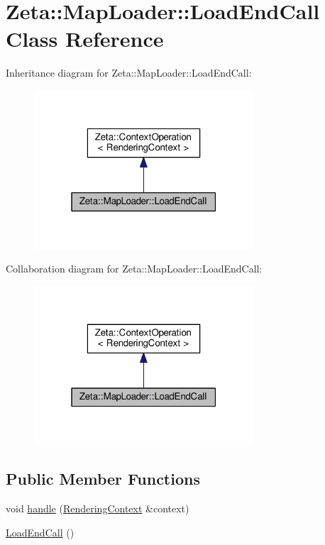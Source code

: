 \hypertarget{classZeta_1_1MapLoader_1_1LoadEndCall}{\section{Zeta\+:\+:Map\+Loader\+:\+:Load\+End\+Call Class Reference}
\label{classZeta_1_1MapLoader_1_1LoadEndCall}
}


Inheritance diagram for Zeta\+:\+:Map\+Loader\+:\+:Load\+End\+Call\+:\nopagebreak
\begin{figure}[H]
\begin{center}
\leavevmode
\includegraphics[width=232pt]{classZeta_1_1MapLoader_1_1LoadEndCall__inherit__graph}
\end{center}
\end{figure}


Collaboration diagram for Zeta\+:\+:Map\+Loader\+:\+:Load\+End\+Call\+:\nopagebreak
\begin{figure}[H]
\begin{center}
\leavevmode
\includegraphics[width=232pt]{classZeta_1_1MapLoader_1_1LoadEndCall__coll__graph}
\end{center}
\end{figure}
\subsection*{Public Member Functions}
\begin{DoxyCompactItemize}
\item 
void \hyperlink{classZeta_1_1MapLoader_1_1LoadEndCall_a332c82fb3a3285762b3619492ace2f07}{handle} (\hyperlink{classZeta_1_1RenderingContext}{Rendering\+Context} \&context)
\item 
\hyperlink{classZeta_1_1MapLoader_1_1LoadEndCall_aa867f93d5f176e1ba42cee769150164e}{Load\+End\+Call} ()
\end{DoxyCompactItemize}

